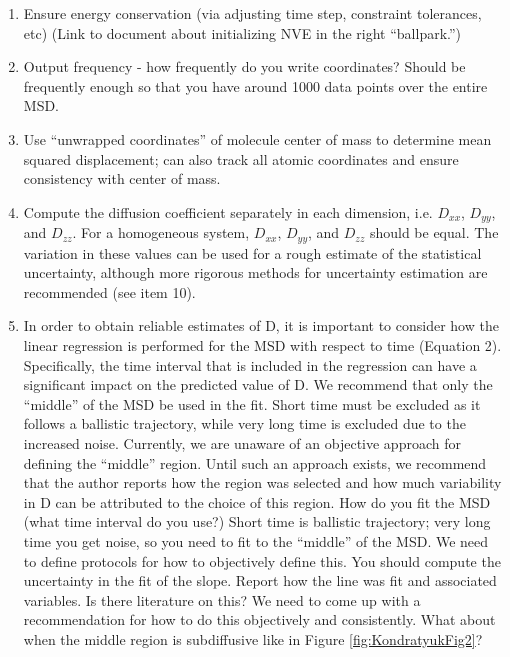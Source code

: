 \documentclass[9pt]{livecoms}
\begin{document}
\begin{enumerate}
	\item Ensure energy conservation (via adjusting time step, constraint tolerances, etc) (Link to document about initializing NVE in the right “ballpark.”) 
	\item Output frequency - how frequently do you write coordinates? Should be frequently enough so that you have around 1000 data points over the entire MSD.
	\item Use ``unwrapped coordinates'' of molecule center of mass to determine mean squared displacement; can also track all atomic coordinates and ensure consistency with center of mass.
	\item Compute the diffusion coefficient separately in each dimension, i.e. $D_{xx}$, $D_{yy}$, and $D_{zz}$. For a homogeneous system, $D_{xx}$, $D_{yy}$, and $D_{zz}$ should be equal. The variation in these values can be used for a rough estimate of the statistical uncertainty, although more rigorous methods for uncertainty estimation are recommended (see item 10).
	\item In order to obtain reliable estimates of D, it is important to consider how the linear regression is performed for the MSD with respect to time (Equation 2). Specifically, the time interval that is included in the regression can have a significant impact on the predicted value of D. We recommend that only the “middle” of the MSD be used in the fit. Short time must be excluded as it follows a ballistic trajectory, while very long time is excluded due to the increased noise. Currently, we are unaware of an objective approach for defining the “middle” region. Until such an approach exists, we recommend that the author reports how the region was selected and how much variability in D can be attributed to the choice of this region. 
	How do you fit the MSD (what time interval do you use?) Short time is ballistic trajectory; very long time you get noise, so you need to fit to the “middle” of the MSD. We need to define protocols for how to objectively define this. You should compute the uncertainty in the fit of the slope. Report how the line was fit and associated variables. Is there literature on this? We need to come up with a recommendation for how to do this objectively and consistently. 
	What about when the middle region is subdiffusive like in Figure \ref{fig:KondratyukFig2}?

\end{enumerate}
\end{document}
